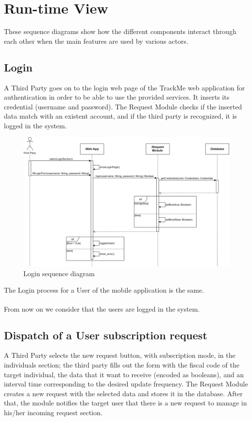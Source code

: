 \section{Run-time View}
These sequence diagrams show how the different components interact through each other when the main features are used by various actors.
\subsection{Login}
A Third Party goes on to the login web page of the TrackMe web application for authentication in order to be able to use the provided services. It inserts its credential (username and password). The Request Module checks if the inserted data match with an existent account, and if the third party is recognized, it is logged in the system.

\begin{figure}[H]
    \centering
    \includegraphics[scale=0.17]{DD/Pictures/login.png}
    \caption{Login sequence diagram}
\end{figure}

The Login process for a User of the mobile application is the same.\\ \\
From now on we consider that the users are logged in the system.

\subsection{Dispatch of a User subscription request}
A Third Party selects the new request button, with subscription mode, in the individuals section; the third party fills out the form with the fiscal code of the target individual, the data that it want to receive (encoded as booleans), and an interval time corresponding to the desired update frequency. The Request Module creates a new request with the selected data and stores it in the database. After that, the module notifies the target user that there is a new request to manage in his/her incoming request section.

